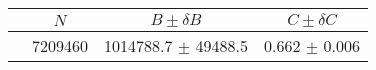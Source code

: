 \begin{tabular}{lccc}
\hline
    &   $N$   & $B \pm \delta B$  &  $C \pm \delta C$ \\
\hline
                               & 7209460    & 1014788.7  $\pm$ 49488.5 & 0.662      $\pm$ 0.006 \\
\hline
\end{tabular}

